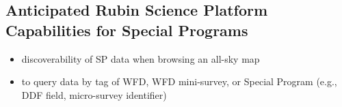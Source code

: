 \documentclass[DM,lsstdoc,toc]{lsstdoc}
\begin{document}
\subsection{Anticipated Rubin Science Platform Capabilities for Special Programs }

\begin{itemize}
\item discoverability of SP data when browsing an all-sky map
\item to query data by tag of WFD, WFD mini-survey, or Special Program (e.g., DDF field, micro-survey identifier)
\end{itemize}




\clearpage



\clearpage
\appendix










\end{document}
